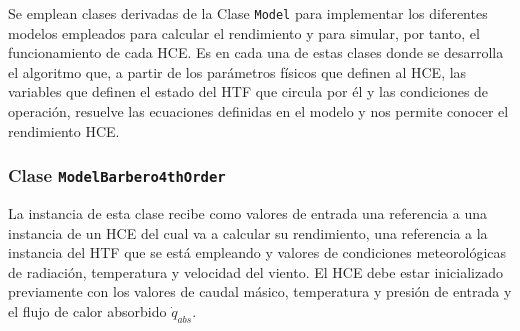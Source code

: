 Se emplean clases derivadas de la Clase \texttt{Model} para implementar los diferentes modelos empleados para calcular el rendimiento y para simular, por tanto, el funcionamiento de cada HCE. Es en cada una de estas clases donde se desarrolla el algoritmo que, a partir de los parámetros físicos que definen al HCE, las variables que definen el estado del HTF que circula por él y las condiciones de operación, resuelve las ecuaciones definidas en el modelo y nos permite conocer el rendimiento HCE.

\subsubsection{Clase \texttt{ModelBarbero4thOrder}}

La instancia de esta clase recibe como valores de entrada una referencia a una instancia de un HCE del cual va a calcular su rendimiento, una referencia a la instancia del HTF que se está empleando y valores de condiciones meteorológicas de radiación, temperatura y velocidad del viento. El HCE debe estar inicializado previamente con los valores de caudal másico, temperatura y presión de entrada y el flujo de calor absorbido \(\dot q_{abs}\).

